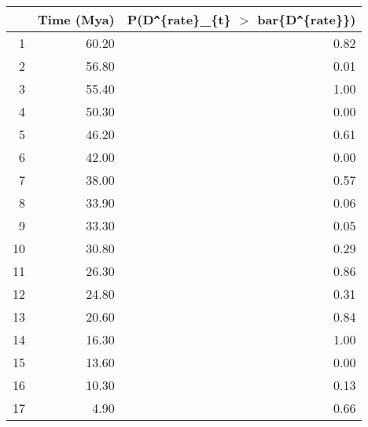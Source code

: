 \begin{table}[ht]
\centering
\begin{tabular}{rrr}
  \hline
 & Time (Mya) & P(D\verb|^|\{rate\}\_\{t\} $>$ bar\{D\verb|^|\{rate\}\}) \\ 
  \hline
1 & 60.20 & 0.82 \\ 
  2 & 56.80 & 0.01 \\ 
  3 & 55.40 & 1.00 \\ 
  4 & 50.30 & 0.00 \\ 
  5 & 46.20 & 0.61 \\ 
  6 & 42.00 & 0.00 \\ 
  7 & 38.00 & 0.57 \\ 
  8 & 33.90 & 0.06 \\ 
  9 & 33.30 & 0.05 \\ 
  10 & 30.80 & 0.29 \\ 
  11 & 26.30 & 0.86 \\ 
  12 & 24.80 & 0.31 \\ 
  13 & 20.60 & 0.84 \\ 
  14 & 16.30 & 1.00 \\ 
  15 & 13.60 & 0.00 \\ 
  16 & 10.30 & 0.13 \\ 
  17 & 4.90 & 0.66 \\ 
   \hline
\end{tabular}
\label{tab:rate_peak}
\end{table}
